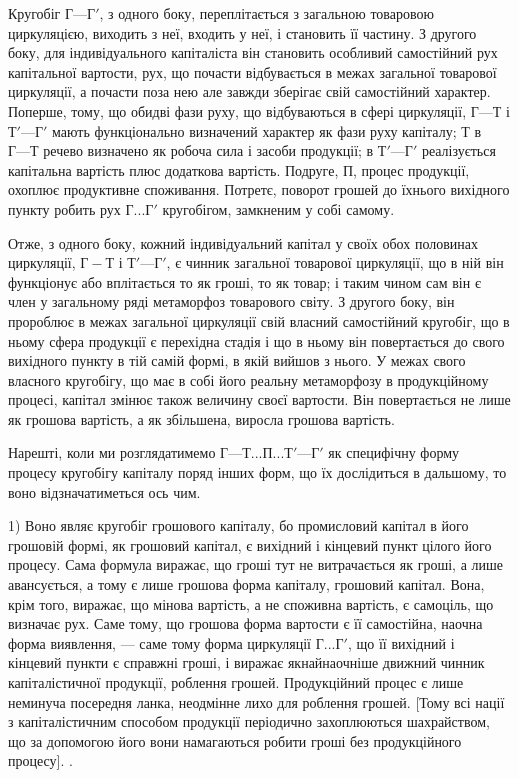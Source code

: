 Кругобіг $Г — Г'$, з одного боку, переплітається з загальною товаровою
циркуляцією, виходить з неї, входить у неї, і становить її частину. З другого
боку, для індивідуального капіталіста він становить особливий самостійний
рух капітальної вартости, рух, що почасти відбувається в межах загальної
товарової циркуляції, а почасти поза нею але завжди зберігає свій самостійний
характер. Поперше, тому, що обидві фази руху, що відбуваються
в сфері циркуляції, $Г — Т$ і $Т' — Г'$ мають функціонально визначений
характер як фази руху капіталу; Т в $Г — Т$ речево визначено як
робоча сила і засоби продукції; в $Т' — Г'$ реалізується капітальна вартість
плюс додаткова вартість. Подруге, П, процес продукції, охоплює продуктивне
споживання. Потретє, поворот грошей до їхнього вихідного пункту
робить рух $Г... Г'$ кругобігом, замкненим у собі самому.

Отже, з одного боку, кожний індивідуальний капітал у своїх обох
половинах циркуляції, $Г-Т$ і $Т' — Г'$, є чинник загальної товарової
циркуляції, що в ній він функціонує або вплітається то як гроші, то як
товар; і таким чином сам він є член у загальному ряді метаморфоз товарового
світу. З другого боку, він пророблює в межах загальної циркуляції свій
власний самостійний кругобіг, що в ньому сфера продукції є перехідна
стадія і що в ньому він повертається до свого вихідного пункту в тій
самій формі, в якій вийшов з нього. У межах свого власного кругобігу,
що має в собі його реальну метаморфозу в продукційному процесі,
капітал змінює також величину своєї вартости. Він повертається не лише
як грошова вартість, а як збільшена, виросла грошова вартість.

Нарешті, коли ми розглядатимемо $Г — Т... П... Т' — Г'$ як специфічну
форму процесу кругобігу капіталу поряд інших форм, що їх дослідиться
в дальшому, то воно відзначатиметься ось чим.

1) Воно являє кругобіг грошового капіталу, бо промисловий капітал
в його грошовій формі, як грошовий капітал, є вихідний і кінцевий
пункт цілого його процесу. Сама формула виражає, що гроші тут не
витрачається як гроші, а лише авансується, а тому є лише грошова
форма капіталу, грошовий капітал. Вона, крім того, виражає, що мінова
вартість, а не споживна вартість, є самоціль, що визначає рух. Саме тому,
що грошова форма вартости є її самостійна, наочна форма виявлення, —
саме тому форма циркуляції $Г... Г'$, що її вихідний і кінцевий
пункти є справжні гроші, і виражає якнайнаочніше движний чинник
капіталістичної продукції, роблення грошей. Продукційний процес
є лише неминуча посередня ланка, неодмінне лихо для роблення грошей.
[Тому всі нації з капіталістичним способом продукції періодично захоплюються
шахрайством, що за допомогою його вони намагаються робити
гроші без продукційного процесу]. .


